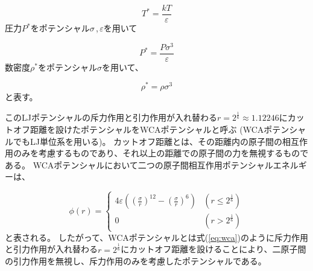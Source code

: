 \documentclass[titlepage]{jsreport}
\begin{document}
\large
\begin{equation}
T^*=\frac{kT}{\varepsilon}\label{eq:T}
\end{equation}
\normalsize
圧力$P^*$をポテンシャル${\sigma}$\,,\,${\varepsilon}$を用いて

\large
\begin{equation}
P^*=\frac{P\sigma^3}{\varepsilon}\label{eq:P}
\end{equation}
\normalsize
数密度$\rho^*$をポテンシャル$\sigma$を用いて、

\large
\begin{equation}
\rho^*=\rho{\sigma}^3\label{eq:rho}
\end{equation}
\normalsize
と表す。



このLJポテンシャルの斥力作用と引力作用が入れ替わる$r=2^{\frac{1}{6}}{\approx}1.12246$にカットオフ距離を設けたポテンシャルをWCAポテンシャルと呼ぶ
(WCAポテンシャルでもLJ単位系を用いる)。
カットオフ距離とは、その距離内の原子間の相互作用のみを考慮するものであり、それ以上の距離での原子間の力を無視するもの\cite{WATANABE20191}である。
WCAポテンシャルにおいて二つの原子間相互作用ポテンシャルエネルギーは、

\large
\begin{equation}
\phi(r) = \left\{ \begin{array}{ll}
    4{\varepsilon}\left(\left(\frac{\sigma}{r}\right)^{12}-\left(\frac{\sigma}{r}\right)^6\right) & (r\leq2^{\frac{1}{6}}) \\
    0 & (r>2^{\frac{1}{6}})\label{eq:wca}
\end{array} \right.
\end{equation}
\normalsize
と表される\cite{doi:10.1063/1.2176675}。
したがって、WCAポテンシャルとは式(\ref{eq:wca})のように斥力作用と引力作用が入れ替わる$r=2^{\frac{1}{6}}$にカットオフ距離を設けることにより、二原子間の引力作用を無視し、斥力作用のみを考慮したポテンシャルである。
\end{document}
